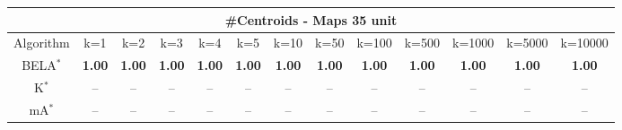 \begin{tabular}{c|cccccccccccc}\toprule
\multicolumn{13}{c}{#Centroids - Maps 35 unit}\\ \midrule
Algorithm & k=1 & k=2 & k=3 & k=4 & k=5 & k=10 & k=50 & k=100 & k=500 & k=1000 & k=5000 & k=10000 \\ \midrule
BELA$^*$ & \textbf{1.00} & \textbf{1.00} & \textbf{1.00} & \textbf{1.00} & \textbf{1.00} & \textbf{1.00} & \textbf{1.00} & \textbf{1.00} & \textbf{1.00} & \textbf{1.00} & \textbf{1.00} & \textbf{1.00} \\
K$^*$ & -- & -- & -- & -- & -- & -- & -- & -- & -- & -- & -- & -- \\
mA$^*$ & -- & -- & -- & -- & -- & -- & -- & -- & -- & -- & -- & -- \\ \bottomrule 
\end{tabular}
